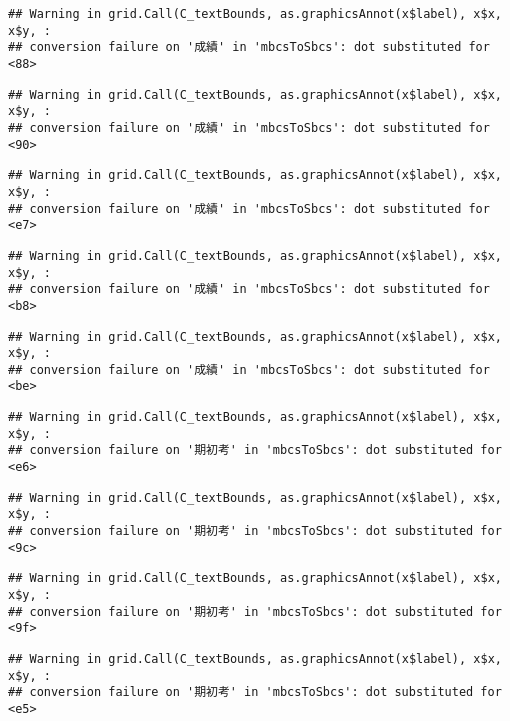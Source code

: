 \documentclass[
]{book}
\begin{document}
\begin{verbatim}
## Warning in grid.Call(C_textBounds, as.graphicsAnnot(x$label), x$x, x$y, :
## conversion failure on '成績' in 'mbcsToSbcs': dot substituted for <88>
\end{verbatim}

\begin{verbatim}
## Warning in grid.Call(C_textBounds, as.graphicsAnnot(x$label), x$x, x$y, :
## conversion failure on '成績' in 'mbcsToSbcs': dot substituted for <90>
\end{verbatim}

\begin{verbatim}
## Warning in grid.Call(C_textBounds, as.graphicsAnnot(x$label), x$x, x$y, :
## conversion failure on '成績' in 'mbcsToSbcs': dot substituted for <e7>
\end{verbatim}

\begin{verbatim}
## Warning in grid.Call(C_textBounds, as.graphicsAnnot(x$label), x$x, x$y, :
## conversion failure on '成績' in 'mbcsToSbcs': dot substituted for <b8>
\end{verbatim}

\begin{verbatim}
## Warning in grid.Call(C_textBounds, as.graphicsAnnot(x$label), x$x, x$y, :
## conversion failure on '成績' in 'mbcsToSbcs': dot substituted for <be>
\end{verbatim}

\begin{verbatim}
## Warning in grid.Call(C_textBounds, as.graphicsAnnot(x$label), x$x, x$y, :
## conversion failure on '期初考' in 'mbcsToSbcs': dot substituted for <e6>
\end{verbatim}

\begin{verbatim}
## Warning in grid.Call(C_textBounds, as.graphicsAnnot(x$label), x$x, x$y, :
## conversion failure on '期初考' in 'mbcsToSbcs': dot substituted for <9c>
\end{verbatim}

\begin{verbatim}
## Warning in grid.Call(C_textBounds, as.graphicsAnnot(x$label), x$x, x$y, :
## conversion failure on '期初考' in 'mbcsToSbcs': dot substituted for <9f>
\end{verbatim}

\begin{verbatim}
## Warning in grid.Call(C_textBounds, as.graphicsAnnot(x$label), x$x, x$y, :
## conversion failure on '期初考' in 'mbcsToSbcs': dot substituted for <e5>
\end{verbatim}
\end{document}
